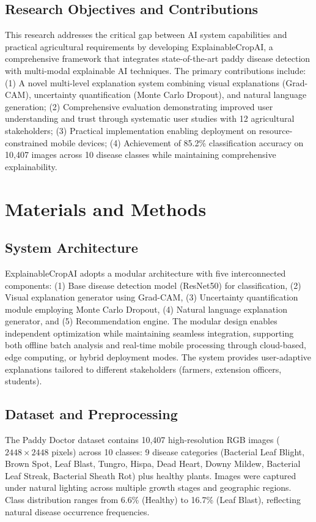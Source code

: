 \documentclass[agriculture,article,submit,pdftex,moreauthors]{Definitions/mdpi}
\begin{document}
\subsection{Research Objectives and Contributions}

This research addresses the critical gap between AI system capabilities and practical agricultural requirements by developing ExplainableCropAI, a comprehensive framework that integrates state-of-the-art paddy disease detection with multi-modal explainable AI techniques. The primary contributions include: (1) A novel multi-level explanation system combining visual explanations (Grad-CAM), uncertainty quantification (Monte Carlo Dropout), and natural language generation; (2) Comprehensive evaluation demonstrating improved user understanding and trust through systematic user studies with 12 agricultural stakeholders; (3) Practical implementation enabling deployment on resource-constrained mobile devices; (4) Achievement of 85.2\% classification accuracy on 10,407 images across 10 disease classes while maintaining comprehensive explainability.

\section{Materials and Methods}

\subsection{System Architecture}

ExplainableCropAI adopts a modular architecture with five interconnected components: (1) Base disease detection model (ResNet50) for classification, (2) Visual explanation generator using Grad-CAM, (3) Uncertainty quantification module employing Monte Carlo Dropout, (4) Natural language explanation generator, and (5) Recommendation engine. The modular design enables independent optimization while maintaining seamless integration, supporting both offline batch analysis and real-time mobile processing through cloud-based, edge computing, or hybrid deployment modes. The system provides user-adaptive explanations tailored to different stakeholders (farmers, extension officers, students).

\subsection{Dataset and Preprocessing}

The Paddy Doctor dataset \cite{das2020paddy} contains 10,407 high-resolution RGB images ($2448 \times 2448$ pixels) across 10 classes: 9 disease categories (Bacterial Leaf Blight, Brown Spot, Leaf Blast, Tungro, Hispa, Dead Heart, Downy Mildew, Bacterial Leaf Streak, Bacterial Sheath Rot) plus healthy plants. Images were captured under natural lighting across multiple growth stages and geographic regions. Class distribution ranges from 6.6\% (Healthy) to 16.7\% (Leaf Blast), reflecting natural disease occurrence frequencies.
\end{document}
